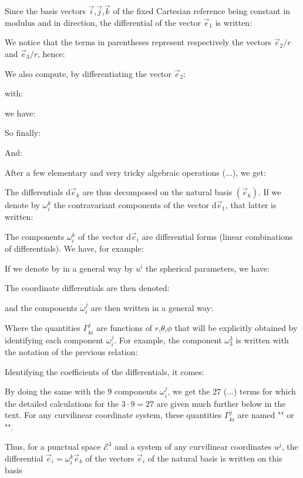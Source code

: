 	Since the basis vectors $\vec{i}$,$\vec{j}$,$\vec{k}$ of the fixed Cartesian reference being constant in modulus and in direction, the differential of the vector $\vec{e}_1$ is written:
	
	We notice that the terms in parentheses represent respectively the vectors $\vec{e}_2/r$ and $\vec{e}_3/r$, hence:
	
	We also compute, by differentiating the vector $\vec{e}_2$:
	
	with:
	
	we have:
	
	So finally:
	
	And:
	
	After a few elementary and very tricky algebraic operations (...), we get:
	
	The differentials $\mathrm{d}\vec{e}_k$ are thus decomposed on the natural basis $(\vec{e}_k)$. If we denote by $\omega_i^k$ the contravariant components of the vector $\mathrm{d}\vec{e}_1$, that latter is written:
	
	The components $\omega_i^k$ of the vector $\mathrm{d}\vec{e}_i$ are differential forms (linear combinations of differentials). We have, for example:
	
	If we denote by in a general way by $u^i$ the spherical parameters, we have:
	
	The coordinate differentials are then denoted:
	
	and the components $\omega_i^j$ are then written in a general way:
	
	Where the quantities $\Gamma_{ki}^j$ are functions of $r$,$\theta$,$\phi$ that will be explicitly obtained by identifying each component $\omega_i^j$. For example, the component $\omega_3^3$ is written with the notation of the previous relation:
	
	Identifying the coefficients of the differentials, it comes:
	
	By doing the same with the $9$ components $\omega_i^j$, we get the $27$ (...) terms for which the detailed calculations for the $3\cdot 9=27$ are given much further below in the text. For any curvilinear coordinate system, these quantities $\Gamma_{ki}^j$ are named "\label{Christoffel symbols of the second kind}" or "".
	
	Thus, for a punctual space $\mathcal{E}^3$ and a system of any curvilinear coordinates $u^j$, the differential $\mathrm{}\vec{e}_i=\omega_i^k\vec{e}_k$ of the vectors $\vec{e}_i$ of the natural basis is written on this basis
	 
